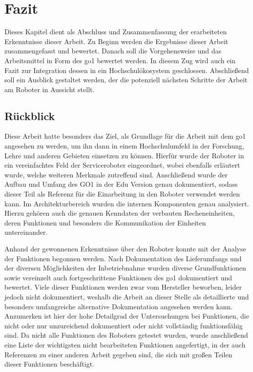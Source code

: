 \clearpage

\section{Fazit}
\label{sec:fazit}

Dieses Kapitel dient als Abschluss und Zusammenfassung der erarbeiteten Erkenntnisse dieser Arbeit.
Zu Beginn werden die Ergebnisse dieser Arbeit zusammengefasst und bewertet.
Danach soll die Vorgehensweise und das Arbeitsmittel in Form des \gls{go1} bewertet werden.
In diesem Zug wird auch ein Fazit zur Integration dessen in ein Hochschulökosystem geschlossen.
Abschließend soll ein Ausblick gestaltet werden, der die potenziell nächsten Schritte der Arbeit am Roboter in Aussicht stellt.

\subsection{Rückblick}
\label{subsec:ruckblick}

Diese Arbeit hatte besonders das Ziel, als Grundlage für die Arbeit mit dem \gls{go1} angesehen zu werden, um ihn dann in einem
Hochschulumfeld in der Forschung, Lehre und anderen Gebieten einsetzen zu können.
Hierfür wurde der Roboter in ein vereinfachtes Feld der Serviceroboter eingeordnet, wobei ebenfalls erläutert wurde, welche weiteren
Merkmale zutreffend sind.
Anschließend wurde der Aufbau und Umfang des GO1 in der Edu Version genau dokumentiert, sodass dieser Teil als Referenz für die
Einarbeitung in den Roboter verwendet werden kann.
Im Architekturbereich wurden die internen Komponenten genau analysiert.
Hierzu gehören auch die genauen Kenndaten der verbauten Recheneinheiten, deren Funktionen und besonders die Kommunikation
der Einheiten untereinander.

Anhand der gewonnenen Erkenntnisse über den Roboter konnte mit der Analyse der Funktionen begonnen werden.
Nach Dokumentation des Lieferumfangs und der diversen Möglichkeiten der Inbetriebnahme wurden diverse Grundfunktionen sowie
vereinzelt auch fortgeschrittene Funktionen des \gls{go1} dokumentiert und bewertet.
Viele dieser Funktionen werden zwar vom Hersteller beworben, leider jedoch nicht dokumentiert, weshalb die Arbeit
an dieser Stelle als detaillierte und besonders umfangreiche alternative Dokumentation angesehen werden kann.
Anzumerken ist hier der hohe Detailgrad der Untersuchungen bei Funktionen, die nicht oder nur unzureichend
dokumentiert oder nicht vollständig funktionsfähig sind.
Da nicht alle Funktionen des Roboters getestet wurden, wurde anschließend eine Liste der wichtigsten nicht bearbeiteten Funktionen
angefertigt, in der auch Referenzen zu einer anderen Arbeit gegeben sind, die sich mit großen Teilen dieser
Funktionen beschäftigt.

